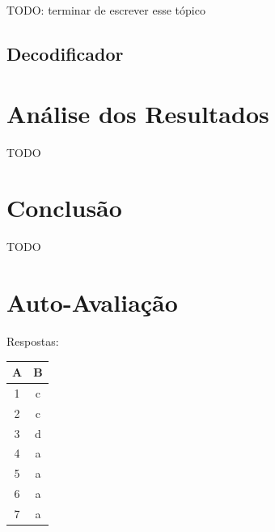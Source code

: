 \documentclass[12pt]{article}
\begin{document}
TODO: terminar de escrever esse tópico

\subsection{Decodificador}\label{sec:boolean_functions_decoder}



\section{Análise dos Resultados}
\label{sec:Resultados}

TODO

\section{Conclusão}
\label{sec:Conclusao}

TODO

\nocite{*}



\newpage
\section*{Auto-Avaliação}

Respostas:

\begin{table}[H]
      \begin{tabular}{|c|c|} \hline
      \textbf{A} & \textbf{B}\\
      \hline
      1 & c \\ \hline
      2 & c \\ \hline
      3 & d \\ \hline
      4 & a \\ \hline
      5 & a \\ \hline
      6 & a \\ \hline
      7 & a \\ \hline
      \end{tabular}
\end{table}
\end{document}
